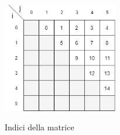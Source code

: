 \vspace{1cm}

\begin{figure}[h] 
\begin{center} 
  \includegraphics[width=5cm]{Images/indices_matrix}\\ 
  \caption{\footnotesize{Indici della matrice}}
  \label{Indici_matrice} 
\end{center} 
\end{figure}




